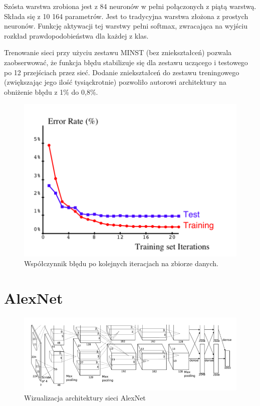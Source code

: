 \documentclass[12pt,a4paper,twoside,titlepage,openright]{book}
\begin{document}
Szósta warstwa zrobiona jest z 84 neuronów w pełni połączonych z piątą warstwą. Składa się z 10 164 parametrów. Jest to tradycyjna warstwa złożona z prostych neuronów. Funkcję aktywacji tej warstwy pełni softmax, zwracająca na wyjściu rozkład prawdopodobieństwa dla każdej z klas.

Trenowanie sieci przy użyciu zestawu MINST (bez zniekształceń) pozwala zaobserwować, że funkcja błędu stabilizuje się dla zestawu uczącego i testowego po 12 przejściach przez sieć. Dodanie zniekształceń do zestawu treningowego (zwiększając jego ilość tysiąckrotnie) pozwoliło autorowi architektury na obniżenie błędu z 1\% do 0,8\%.

\begin{figure}[ht]
	\centering
			\includegraphics[resolution=100, scale=0.45]{leNetTraining.png}
		\caption{Współczynnik błędu po kolejnych iteracjach na zbiorze danych.}
\end{figure}


\section{AlexNet}
\begin{figure}[ht]
	\centering
			\includegraphics[resolution=100, scale=0.65]{AlexNet.png}
		\caption{Wizualizacja architektury sieci AlexNet}
\end{figure}
\end{document}
